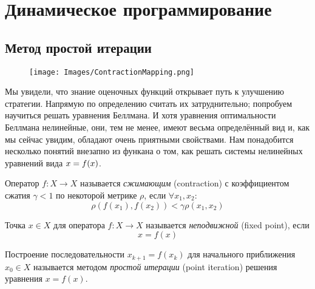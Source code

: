 \section{Динамическое программирование}\label{valueiterationsection}

\subsection{Метод простой итерации}

\begin{wrapfigure}{r}{0.45\textwidth}
\vspace{-1cm}
\centering
\texttt{[image: Images/ContractionMapping.png]}
\vspace{-0.4cm}
\end{wrapfigure}

Мы увидели, что знание оценочных функций открывает путь к улучшению стратегии. Напрямую по определению считать их затруднительно; попробуем научиться решать уравнения Беллмана. И хотя уравнения оптимальности Беллмана нелинейные, они, тем не менее, имеют весьма определённый вид и, как мы сейчас увидим, обладают очень приятными свойствами. Нам понадобится несколько понятий внезапно из функана о том, как решать системы нелинейных уравнений вида $x \HM= f(x)$.

\begin{definition}
Оператор $f \colon X \to X$ называется \emph{сжимающим} (contraction) с коэффициентом сжатия $\gamma < 1$ по некоторой метрике $\rho$, если $\forall x_1, x_2 \colon$
$$\rho(f(x_1), f(x_2)) < \gamma \rho(x_1, x_2)$$
\end{definition}

\begin{definition}
Точка $x \in X$ для оператора $f \colon X \to X$ называется \emph{неподвижной} (fixed point), если
$$x = f(x)$$
\end{definition}

\begin{definition}
Построение последовательности $x_{k+1} = f(x_k)$ для начального приближения $x_0 \in X$ называется методом \emph{простой итерации} (point iteration) решения уравнения $x = f(x)$.
\end{definition}

